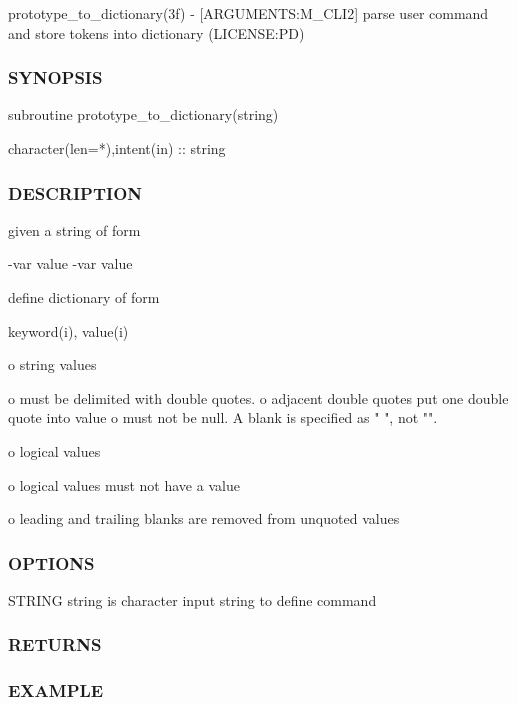 prototype\+\_\+to\+\_\+dictionary(3f) -\/ \mbox{[}A\+R\+G\+U\+M\+E\+N\+TS\+:M\+\_\+\+C\+L\+I2\mbox{]} parse user command and store tokens into dictionary (L\+I\+C\+E\+N\+SE\+:PD) 

\subsubsection*{S\+Y\+N\+O\+P\+S\+IS}

\begin{DoxyVerb} subroutine prototype_to_dictionary(string)

  character(len=*),intent(in)     ::  string
\end{DoxyVerb}


\subsubsection*{D\+E\+S\+C\+R\+I\+P\+T\+I\+ON}

given a string of form

-\/var value -\/var value

define dictionary of form

keyword(i), value(i)

o string values \begin{DoxyVerb}o must be delimited with double quotes.
o adjacent double quotes put one double quote into value
o must not be null. A blank is specified as " ", not "".
\end{DoxyVerb}


o logical values \begin{DoxyVerb}o logical values must not have a value
\end{DoxyVerb}


o leading and trailing blanks are removed from unquoted values

\subsubsection*{O\+P\+T\+I\+O\+NS}

S\+T\+R\+I\+NG string is character input string to define command

\subsubsection*{R\+E\+T\+U\+R\+NS}

\subsubsection*{E\+X\+A\+M\+P\+LE}

